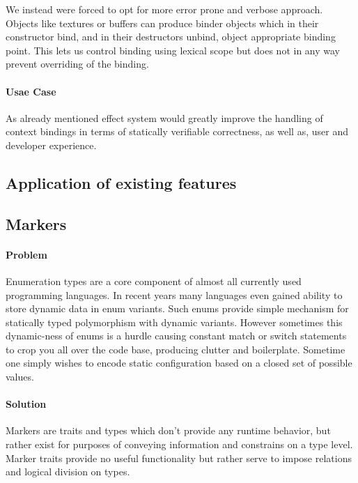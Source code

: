 We instead were forced to opt for more error prone and verbose approach. 
Objects like textures or buffers can produce binder objects which in their constructor bind, and in their destructors unbind, object appropriate binding point.
This lets us control binding using lexical scope but does not in any way prevent overriding of the binding.

\paragraph{Usae Case}

As already mentioned effect system would greatly improve the handling of context bindings in terms of statically verifiable correctness, as well as, user and developer experience.

\subsection{Application of existing features}

\subsection{Markers}

\paragraph{Problem}

Enumeration types are a core component of almost all currently used programming languages. In recent years many languages even gained ability to store dynamic data in enum variants.
Such enums provide simple mechanism for statically typed polymorphism with dynamic variants. 
However sometimes this dynamic-ness of enums is a hurdle causing constant match or switch statements to crop you all over the code base, producing clutter and boilerplate.
Sometime one simply wishes to encode static configuration based on a closed set of possible values.

\paragraph{Solution}

Markers are traits and types which don't provide any runtime behavior, but rather exist for purposes of conveying information and constrains on a type level.
Marker traits provide no useful functionality but rather serve to impose relations and logical division on types.

